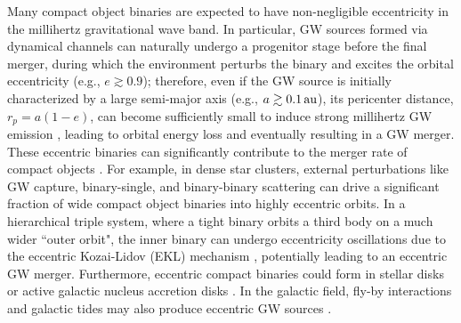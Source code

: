 \documentclass[%
 reprint,
 amsmath,amssymb,
 aps,
]{revtex4-2}
\begin{document}
Many compact object binaries are expected to have non-negligible eccentricity in the millihertz gravitational wave band. In particular, GW sources formed via dynamical channels can naturally undergo a progenitor stage before the final merger, during which the environment perturbs the binary and excites the orbital eccentricity (e.g., $e\gtrsim 0.9$); therefore, even if the GW source is initially characterized by a large semi-major axis (e.g., $a\gtrsim 0.1 \,\rm au$), its pericenter distance, $r_p=a(1-e)$, can become sufficiently small to induce strong millihertz GW emission \citep[][]{Loutrel_2017,Loutrel+20,Xuan+23b}, leading to orbital energy loss and eventually resulting in a GW merger. These eccentric binaries can significantly contribute to the merger rate of compact objects \citep[][]{wen03,Hoang+18,Hamers+18,Stephan+19,Zevin_2019,Bub+20,Deme+20,Wang+21,Zevin_2021}. For example, in dense star clusters, external perturbations like GW capture, binary-single, and binary-binary scattering \citep[e.g.,][]{O'Leary+09,Thompson+11,Aarseth+12,Kocsis_2012,breivik16,Gondan_2018a,Orazio+18,Zevin_2019,Samsing+19,Stephan+16,Hoang+20,Martinez+20,Antonini+19,Kremer_2020,wintergranic2023binary,Gondan_Kocsis2021,Zhang+21,Fragione+22clustermerger,Samsing+2022,Rowan+23agn,purohit2024binary} can drive a significant fraction of wide compact object binaries into highly eccentric orbits. In a hierarchical triple system, where a tight binary orbits a third body on a much wider ``outer orbit", the inner binary can undergo eccentricity oscillations due to the eccentric Kozai-Lidov (EKL) mechanism \citep{Kozai1962,Lidov1962,Ligongjie+15ekl,Naoz16,Hoang+18}, potentially leading to an eccentric GW merger. Furthermore, eccentric compact binaries could form in stellar disks or active galactic nucleus accretion disks  \citep{tagawa+20agn,Tagawa+2021,Samsing+2022,Munoz+22,Gautham+23,Arca+23,Yan+23highspeedsource,peng+23EMRIAGN,Whitehead+24agngas,Zhu+24AGN}. In the galactic field, fly-by interactions and galactic tides may also produce eccentric GW sources \citep[e.g.,][]{Michaely+19,Michaely+20,Michaely+22,Jakob24flyby}. 
\end{document}
